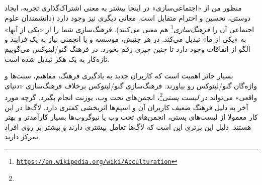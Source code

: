 
منظور من از «اجتماعی‌سازی» در اینجا بیشتر به معنی اشتراک‌گذاری تجربه،
ایجاد دوستی، تحسین و احترام متقابل است. معانی دیگری نیز وجود دارد
(دانشمندان علوم اجتماعی آن را
\emph{فرهنگ‌سازی}\footnote{\texttt{\url{https://en.wikipedia.org/wiki/Acculturation}}}
هم معنی می‌کنند).
فرهنگ‌سازی شما را از «یکی از آنها» به «یکی از ما» تبدیل می‌کند.
در هر جنبش، موسسه و یا انجمنی نیاز به یک فرایند و الگو از اتفاقات وجود دارد
تا چنین چیزی رقم بخورد. در فرهنگ گنو/لینوکس می‌گوییم تازه‌کار به یک هکر تبدیل شده است.


بسیار حائز اهمیت است که کاربران جدید به یادگیری فرهنگ، مفاهیم، سنت‌ها
و واژه‌گان گنو/لینوکس رو بیاورند. فرهنگ‌سازی گنو/لینوکس برخلاف فرهنگ‌سازی «دنیای واقعی»
می‌تواند در
\emph{لیست پستی}\footnote{}،
انجمن‌های تحت وب، یوزنت انجام بگیرد. گرچه مورد آخر به دلیل فرهنگ ضعیف کاربران آن
و اسپم‌ها اثربخشی کمتری دارد.
لاگ‌ها در این کار معمولا از لیست‌های پستی، انجمن‌های تحت وب یا نیوگروپ‌ها بسیار کارآمدتر
و بهتر هستند. دلیل این برتری این است که لاگ‌ها تعامل بیشتری دارند و بیشتر بر روی
افراد تمرکز دارند.

